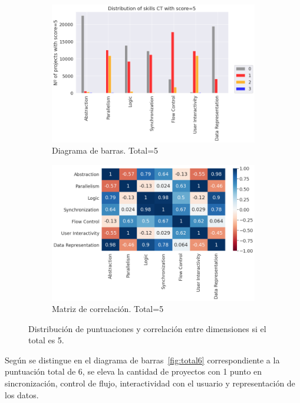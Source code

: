 \documentclass[a4paper, 12pt]{book}
\begin{document}
\begin{figure}
    \centering
    \begin{subfigure}[h]{.49\textwidth} 
        \includegraphics[width=\textwidth]{img/distribucion_5_Scratch}
        \caption{Diagrama de barras. Total=5}
        \label{fig:total5}
    \end{subfigure}       
    \begin{subfigure}[h]{.49\textwidth} 
        \includegraphics[width=\textwidth]{img/corr_5_Scratch}
        \caption{Matriz de correlación. Total=5}
        \label{fig:corr5}
    \end{subfigure}
     \caption{Distribución de puntuaciones y correlación entre dimensiones si el total es 5.}
\end{figure}

Según se distingue en el diagrama de barras~\ref{fig:total6} correspondiente a la puntuación total de 6, se eleva la cantidad de proyectos con 1 punto en sincronización, control de flujo, interactividad con el usuario y representación de los datos.
\end{document}
